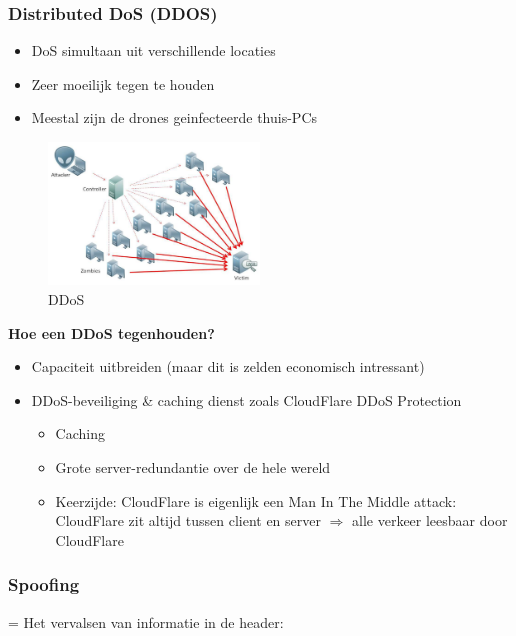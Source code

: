 \documentclass{article}
\newcommand{\bold}[1]{\textbf{#1}}
\begin{document}
\subsubsection{Distributed DoS (DDOS)}

\begin{itemize}
    \item DoS simultaan uit verschillende locaties
    \item Zeer moeilijk tegen te houden
    \item Meestal zijn de drones geinfecteerde thuis-PCs
\end{itemize}

\begin{figure}[H]
    \centering
    \includegraphics[width=0.5\textwidth]{ddos.png}
    \caption{DDoS}
\end{figure}

\bold{Hoe een DDoS tegenhouden?}

\begin{itemize}
    \item Capaciteit uitbreiden (maar dit is zelden economisch intressant)
    \item DDoS-beveiliging \& caching dienst zoals CloudFlare DDoS Protection
    \begin{itemize}
        \item Caching
        \item Grote server-redundantie over de hele wereld
        \item Keerzijde: CloudFlare is eigenlijk een Man In The Middle attack: CloudFlare zit altijd tussen client en server $\Rightarrow$ alle verkeer leesbaar door CloudFlare
    \end{itemize}
\end{itemize}

\subsubsection{Spoofing}

= Het vervalsen van informatie in de header:
\end{document}
